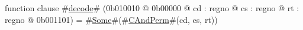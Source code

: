 function clause #\hyperref[zdecode]{decode}# (0b010010 @ 0b00000 @ cd : regno @ cs : regno @ rt : regno @ 0b001101) = #\hyperref[zSome]{Some}#(#\hyperref[zCAndPerm]{CAndPerm}#(cd, cs, rt))
